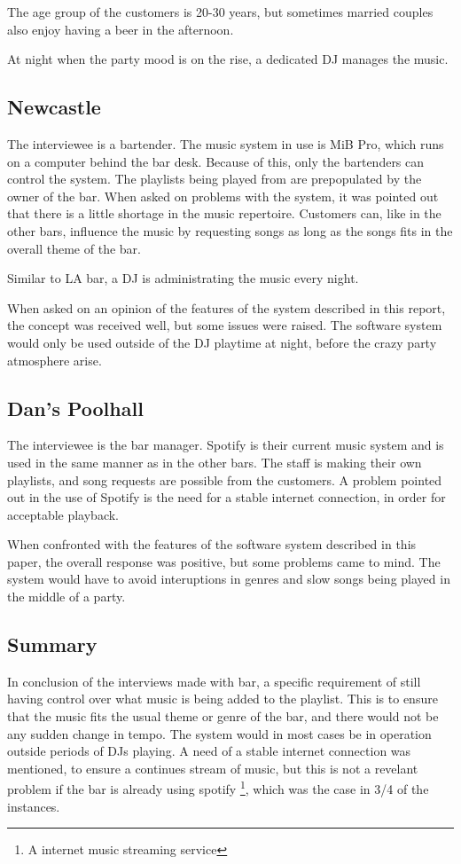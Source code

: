 The age group of the customers is 20-30 years, but sometimes married couples also enjoy having a beer in the afternoon.

At night when the party mood is on the rise, a dedicated DJ manages the music.

\subsection{Newcastle}
\label{sub:newcastle}

The interviewee is a bartender. The music system in use is MiB Pro, which runs on a computer behind the bar desk. Because of this, only the bartenders can control the system. The playlists being played from are prepopulated by the owner of the bar. When asked on problems with the system, it was pointed out that there is a little shortage in the music repertoire. Customers can, like in the other bars, influence the music by requesting songs as long as the songs fits in the overall theme of the bar.

Similar to LA bar, a DJ is administrating the music every night.

When asked on an opinion of the features of the system described in this report, the concept was received well, but some issues were raised. The software system would only be used outside of the DJ playtime at night, before the crazy party atmosphere arise.

\subsection{Dan's Poolhall}
\label{sub:dan_s_poolhall}

The interviewee is the bar manager. Spotify is their current music system and is used in the same manner as in the other bars. The staff is making their own playlists, and song requests are possible from the customers. A problem pointed out in the use of Spotify is the need for a stable internet connection, in order for acceptable playback. 

When confronted with the features of the software system described in this paper, the overall response was positive, but some problems came to mind. The system would have to avoid interuptions in genres and slow songs being played in the middle of a party.

\subsection{Summary}
\label{sub:summary}

In conclusion of the interviews made with bar, a specific requirement of still having control over what music is being added to the playlist. This is to ensure that the music fits the usual theme or genre of the bar, and there would not be any sudden change in tempo. The system would in most cases be in operation outside periods of DJs playing. A need of a stable internet connection was mentioned, to ensure a continues stream of music, but this is not a revelant problem  if the bar is already using spotify \footnote{A internet music streaming service}, which was the case in 3/4 of the instances.